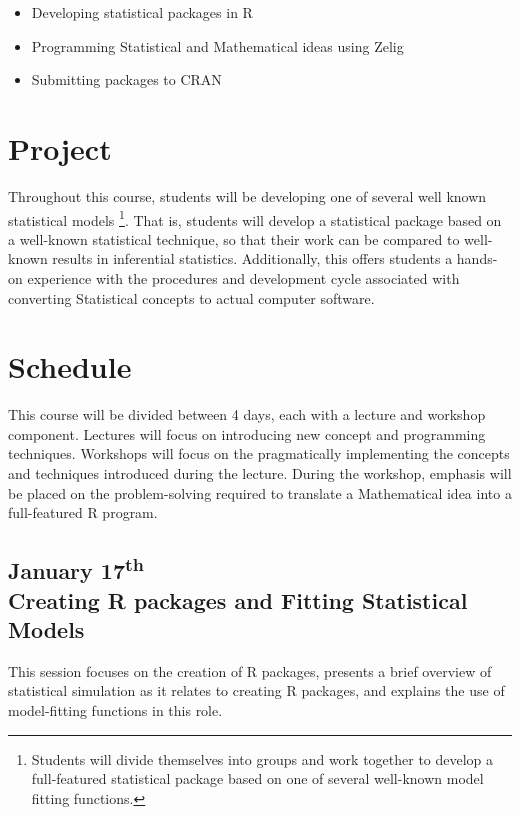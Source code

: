 \documentclass{article}
\begin{document}
\begin{itemize}
	\item Developing statistical packages in R
	\item Programming Statistical and Mathematical ideas using Zelig
	\item Submitting packages to CRAN
\end{itemize}



\section{Project}
\label{project}

Throughout this course, students will be developing one of several well known statistical models
\footnote{Students will divide themselves into groups and work together to develop a full-featured
statistical package based on one of several well-known model fitting functions.}.
That is, students will develop a statistical package based on a well-known statistical technique, 
so that their work can be compared to well-known results in inferential statistics. Additionally,
this offers students a hands-on experience with the procedures and development cycle associated
with converting Statistical concepts to actual computer software.




\section{Schedule}
\label{schedule}

This course will be divided between 4 days, each with a lecture and workshop component.
Lectures will focus on introducing new concept and programming techniques. Workshops will
focus on the pragmatically implementing the concepts and techniques introduced during the
lecture. During the workshop, emphasis will be placed on the problem-solving required to 
translate a Mathematical idea into a full-featured R program.



\subsection{January 17\textsuperscript{th} \\ Creating R packages and Fitting Statistical Models}
  
This session focuses on the creation of R packages, presents a brief overview of statistical simulation
as it relates to creating R packages, and explains the use of model-fitting functions in this role.
  
\end{document}
